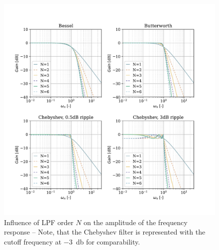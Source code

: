 \begin{figure}[!htb]
    \centering
    \includegraphics[scale=0.72]{figures/electronics/lowpass/lp_filter_mag}
    \caption[Influence of \ac{LPF} order $N$ on the amplitude of the frequency response]{Influence of \ac{LPF} order $N$ on the amplitude of the frequency response -- Note, that the Chebyshev filter is represented with the cutoff frequency at \SI{-3}{\decibel} for comparability.}
    \label{fig:lp_filter_mag}
\end{figure}

